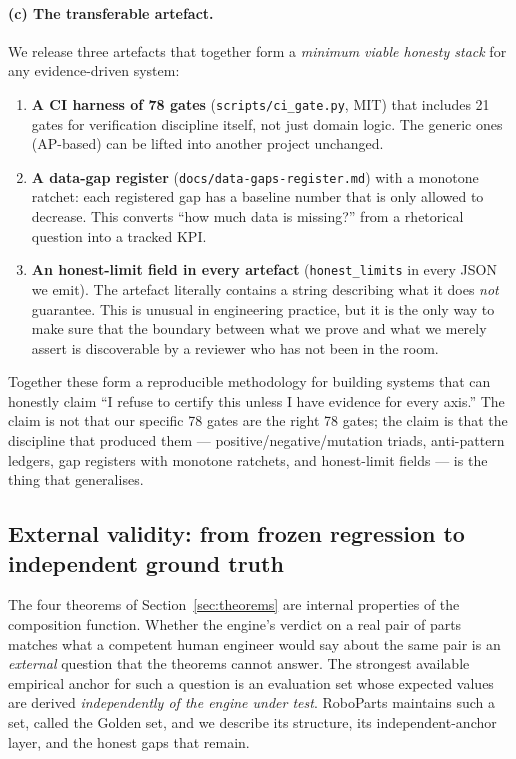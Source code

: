 \documentclass[11pt,twocolumn]{article}
\begin{document}
\paragraph{(c) The transferable artefact.}
We release three artefacts that together form a
\emph{minimum viable honesty stack} for any evidence-driven system:

\begin{enumerate}
\item \textbf{A CI harness of 78 gates} (\texttt{scripts/ci\_gate.py},
MIT) that includes 21 gates for verification discipline itself, not
just domain logic. The generic ones (AP-based) can be lifted into
another project unchanged.
\item \textbf{A data-gap register} (\texttt{docs/data-gaps-register.md})
with a monotone ratchet: each registered gap has a baseline number
that is only allowed to decrease. This converts ``how much data is
missing?'' from a rhetorical question into a tracked KPI.
\item \textbf{An honest-limit field in every artefact}
(\texttt{honest\_limits} in every JSON we emit). The artefact
literally contains a string describing what it does \emph{not}
guarantee. This is unusual in engineering practice, but it is the
only way to make sure that the boundary between what we prove and
what we merely assert is discoverable by a reviewer who has not been
in the room.
\end{enumerate}

Together these form a reproducible methodology for building systems
that can honestly claim ``I refuse to certify this unless I have
evidence for every axis.'' The claim is not that our specific 78
gates are the right 78 gates; the claim is that the discipline that
produced them --- positive/negative/mutation triads, anti-pattern
ledgers, gap registers with monotone ratchets, and honest-limit
fields --- is the thing that generalises.

\subsection{External validity: from frozen regression to independent ground truth}\label{sec:external-validity}

The four theorems of Section~\ref{sec:theorems} are internal
properties of the composition function. Whether the engine's verdict
on a real pair of parts matches what a competent human engineer would
say about the same pair is an \emph{external} question that the
theorems cannot answer. The strongest available empirical anchor for
such a question is an evaluation set whose expected values are derived
\emph{independently of the engine under test}. RoboParts maintains
such a set, called the Golden set, and we describe its structure,
its independent-anchor layer, and the honest gaps that remain.
\end{document}
